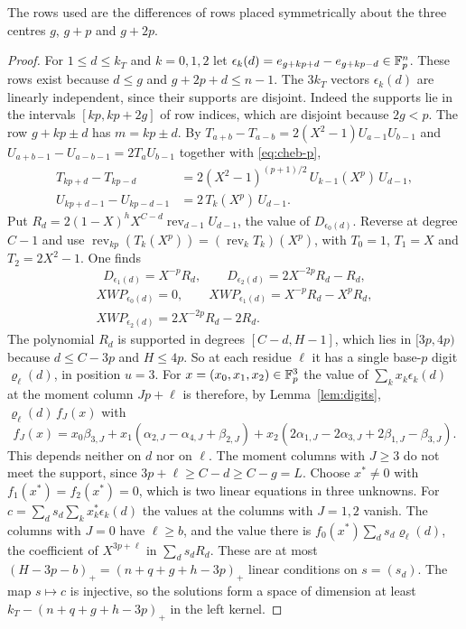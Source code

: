 The rows used are the differences of rows placed symmetrically about the three centres $g$, $g+p$ and
$g+2p$.

\begin{proof}
For $1\le d\le k_T$ and $k=0,1,2$ let $\epsilon_k(d)=e_{g+kp+d}-e_{g+kp-d}\in\mathbb F_p^n$. These rows exist
because $d\le g$ and $g+2p+d\le n-1$. The $3k_T$ vectors $\epsilon_k(d)$ are linearly independent, since their
supports are disjoint. Indeed the supports lie in the intervals $[kp,kp+2g]$ of row indices, which are
disjoint because $2g<p$. The row $g+kp\pm d$ has $m=kp\pm d$. By $T_{a+b}-T_{a-b}=2(X^2-1)U_{a-1}U_{b-1}$
and $U_{a+b-1}-U_{a-b-1}=2T_aU_{b-1}$ together with \eqref{eq:cheb-p},
\begin{align*}
 T_{kp+d}-T_{kp-d}&=2(X^2-1)^{(p+1)/2}\,U_{k-1}(X^p)\,U_{d-1},\\
 U_{kp+d-1}-U_{kp-d-1}&=2\,T_k(X^p)\,U_{d-1}.
\end{align*}
Put $R_d=2(1-X)^hX^{C-d}\operatorname{rev}_{d-1}U_{d-1}$, the value of $D_{\epsilon_0(d)}$. Reverse at degree
$C-1$ and use $\operatorname{rev}_{kp}(T_k(X^p))=(\operatorname{rev}_kT_k)(X^p)$, with $T_0=1$, $T_1=X$ and
$T_2=2X^2-1$. One finds
\[
 D_{\epsilon_1(d)}=X^{-p}R_d,\qquad D_{\epsilon_2(d)}=2X^{-2p}R_d-R_d,
\]
\begin{gather*}
 XWP_{\epsilon_0(d)}=0,\qquad XWP_{\epsilon_1(d)}=X^{-p}R_d-X^pR_d,\\
 XWP_{\epsilon_2(d)}=2X^{-2p}R_d-2R_d .
\end{gather*}
The polynomial $R_d$ is supported in degrees $[C-d,H-1]$, which lies in $[3p,4p)$ because $d\le C-3p$ and
$H\le4p$. So at each residue $\ell$ it has a single base-$p$ digit $\varrho_\ell(d)$, in position $u=3$. For
$x=(x_0,x_1,x_2)\in\mathbb F_p^3$ the value of $\sum_kx_k\epsilon_k(d)$ at the moment column $Jp+\ell$ is therefore,
by Lemma~\ref{lem:digits}, $\varrho_\ell(d)\,f_J(x)$ with
\[
 f_J(x)=x_0\beta_{3,J}+x_1(\alpha_{2,J}-\alpha_{4,J}+\beta_{2,J})+x_2(2\alpha_{1,J}-2\alpha_{3,J}+2\beta_{1,J}-\beta_{3,J}).
\]
This depends neither on $d$ nor on $\ell$. The moment columns with $J\ge3$ do not meet the support, since
$3p+\ell\ge C-d\ge C-g=L$. Choose $x^*\ne0$ with $f_1(x^*)=f_2(x^*)=0$, which is two linear equations in three
unknowns. For $c=\sum_ds_d\sum_kx^*_k\epsilon_k(d)$ the values at the columns with $J=1,2$ vanish. The columns
with $J=0$ have $\ell\ge b$, and the value there is $f_0(x^*)\sum_ds_d\varrho_\ell(d)$, the coefficient of
$X^{3p+\ell}$ in $\sum_ds_dR_d$. These are at most $(H-3p-b)_+=(n+q+g+h-3p)_+$ linear conditions on
$s=(s_d)$. The map $s\mapsto c$ is injective, so the solutions form a space of dimension at least
$k_T-(n+q+g+h-3p)_+$ in the left kernel.
\end{proof}

